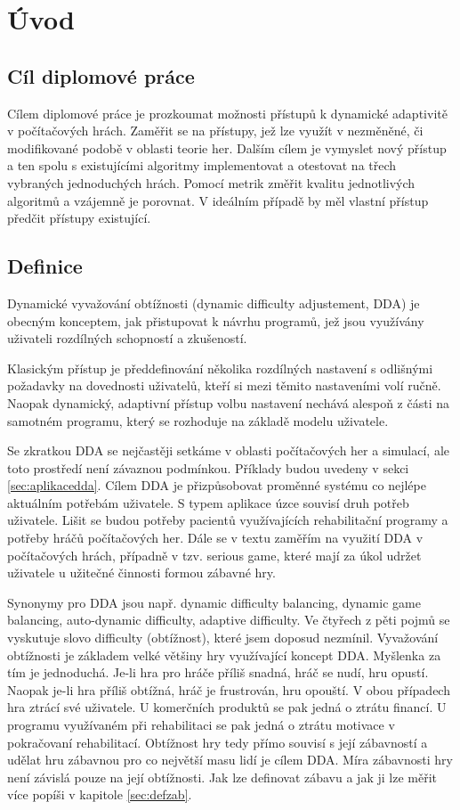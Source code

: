\chapter{Úvod}



\section{Cíl diplomové práce}

Cílem diplomové práce je prozkoumat možnosti přístupů k dynamické adaptivitě v počítačových hrách. Zaměřit se na přístupy, jež lze využít v nezměněné, či modifikované podobě v oblasti teorie her. Dalším cílem je vymyslet nový přístup a ten spolu s existujícími algoritmy implementovat a otestovat na třech vybraných jednoduchých hrách. Pomocí metrik změřit kvalitu jednotlivých algoritmů a vzájemně je porovnat. V ideálním případě by měl vlastní přístup předčit přístupy existující.

\section{Definice}

Dynamické vyvažování obtížnosti (dynamic difficulty adjustement, DDA) je obecným konceptem, jak přistupovat k návrhu programů, jež jsou využívány uživateli rozdílných schopností a zkušeností. 

Klasickým přístup je předdefinování několika rozdílných nastavení s odlišnými požadavky na dovednosti uživatelů, kteří si mezi těmito nastaveními volí ručně. Naopak dynamický, adaptivní přístup volbu nastavení nechává alespoň z části na samotném programu, který se rozhoduje na základě modelu uživatele.

Se zkratkou DDA se nejčastěji setkáme v oblasti počítačových her a simulací, ale toto prostředí není závaznou podmínkou. Příklady budou uvedeny v sekci \ref{sec:aplikacedda}. Cílem DDA je přizpůsobovat proměnné systému co nejlépe aktuálním potřebám uživatele.  S typem aplikace úzce souvisí druh potřeb uživatele. Lišit se budou potřeby pacientů využívajících rehabilitační programy a potřeby hráčů počítačových her. Dále se v textu zaměřím na využití DDA v počítačových hrách, případně v tzv. serious game, které mají za úkol udržet uživatele u užitečné činnosti formou zábavné hry.

Synonymy pro DDA jsou např. dynamic difficulty balancing, dynamic game balancing, auto-dynamic difficulty, adaptive difficulty. Ve čtyřech z pěti pojmů se vyskutuje slovo difficulty (obtížnost), které jsem doposud nezmínil. Vyvažování obtížnosti je základem velké většiny hry využívající koncept DDA. Myšlenka za tím je jednoduchá. Je-li hra pro hráče příliš snadná, hráč se nudí, hru opustí. Naopak je-li hra příliš obtížná, hráč je frustrován, hru opouští. V obou případech hra ztrácí své uživatele. U komerčních produktů se pak jedná o ztrátu financí. U programu využívaném při rehabilitaci se pak jedná o ztrátu motivace v pokračovaní rehabilitací. Obtížnost hry tedy přímo souvisí s její zábavností a udělat hru zábavnou pro co největší masu lidí je cílem DDA. Míra zábavnosti hry není závislá pouze na její obtížnosti. Jak lze definovat zábavu a jak ji lze měřit více popíši v kapitole \ref{sec:defzab}. 

